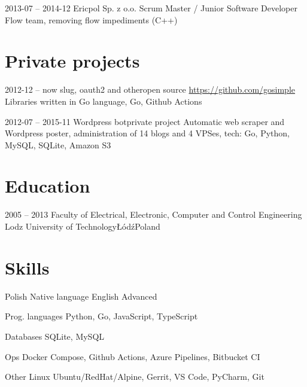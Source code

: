 \documentclass[11pt,a4paper,sans,english]{moderncv}   %
\begin{document}
\cventry
{\small2013-07 -- 2014-12}
	{Ericpol Sp. z o.o.}{}{}
	{Scrum Master / Junior Software Developer}
	{Flow team, removing flow impediments (C++)}


\vspace{-0.3cm}

\section{Private projects}

\cventry
{\small2012-12 -- now}
	{slug, oauth2 and other}{open source}{}
	{\url{https://github.com/gosimple}}
	{Libraries written in Go language, Go, Github Actions}

\cventry
{\small2012-07 -- 2015-11}
	{Wordpress bot}{private project}{}
	{}
	{Automatic web scraper and Wordpress poster,
		administration of 14 blogs and 4 VPSes, tech:
		Go, Python, MySQL, SQLite, Amazon S3}


\vspace{-0.3cm}

\section{Education}

\cventry
{\small2005 -- 2013}
	{Faculty of Electrical, Electronic, Computer and Control Engineering}
	{Lodz University of Technology}{Łódź}{Poland}{}

\vspace{-0.2cm}



\vspace{-0.3cm}

\section{Skills}


\cvitemwithcomment
	{Polish}
	{Native language}{}
\cvitemwithcomment
	{English}
	{Advanced}{}

\cvitemwithcomment
	{\small{Prog. languages}}
	{Python, Go, JavaScript, TypeScript}{}

\cvitemwithcomment
	{\small{Databases}}
	{SQLite, MySQL}{}

\cvitemwithcomment
	{\small{Ops}}
	{Docker Compose, Github Actions, Azure Pipelines, Bitbucket CI}{}

\cvitemwithcomment
	{\small{Other}}
	{\small{Linux Ubuntu/RedHat/Alpine, Gerrit, VS Code, PyCharm, Git}}{}
\end{document}
